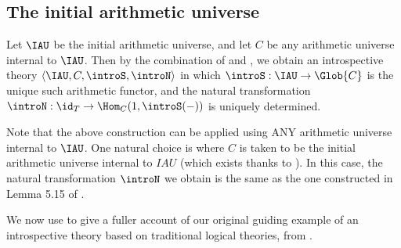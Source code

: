 
\subsection{The initial arithmetic universe}
\begin{construction}\label{IAUAsIntrospGeneral}
Let $\IAU$ be the initial arithmetic universe, and let $C$ be any arithmetic universe internal to $\IAU$. Then by the combination of  and , we obtain an introspective theory $\langle \IAU, C, \introS, \introN \rangle$ in which $\introS : \IAU \to \Glob{C}$ is the unique such arithmetic functor, and the natural transformation $\introN : \id_T \to \Hom_C(1, \introS(-))$ is uniquely determined.
\end{construction}

\begin{observation}
Note that the above construction can be applied using ANY arithmetic universe internal to $\IAU$. One natural choice is where $C$ is taken to be the initial arithmetic universe internal to $IAU$ (which exists thanks to ). In this case, the natural transformation $\introN$ we obtain is the same as the one constructed in Lemma 5.15 of \autocite{van2020g}.
\end{observation}

We now use  to give a fuller account of our original guiding example of an introspective theory based on traditional logical theories, from .

